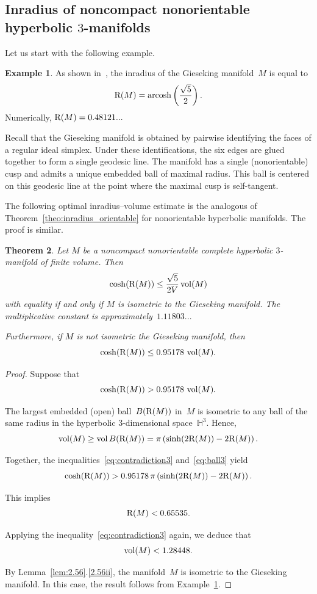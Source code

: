 \documentclass[11pt,reqno]{amsart}
\newtheorem{theorem}{Theorem}[section]
\theoremstyle{definition}
\newtheorem{example}[theorem]{Example}
\numberwithin{equation}{section}
\newcommand{\HH}{{\mathbb H}}
\newcommand\RR{{\rm R}}
\DeclareMathOperator{\vol}{{\rm vol}}
\DeclareMathOperator{\arcosh}{arcosh}
\numberwithin{equation}{section}
\begin{document}
\subsection{Inradius of noncompact nonorientable hyperbolic \texorpdfstring{$3$}{3}-manifolds}

Let us start with the following example.

\begin{example} \label{ex:gieseking}
As shown in~\cite[\S3.2]{gen}, the inradius of the Gieseking manifold~$M$ is equal to
\[
\RR(M) = \arcosh \left( \frac{\sqrt{5}}{2} \right).
\]
Numerically, $\RR(M) = 0.48121...$

Recall that the Gieseking manifold is obtained by pairwise identifying the faces of a regular ideal simplex.
Under these identifications, the six edges are glued together to form a single geodesic line.
The manifold has a single (nonorientable) cusp and admits a unique embedded ball of maximal radius.
This ball is centered on this geodesic line at the point where the maximal cusp is self-tangent.
\end{example}


The following optimal inradius--volume estimate is the analogous of Theorem~\ref{theo:inradius_orientable}  for nonorientable hyperbolic manifolds.
The proof is similar.


\begin{theorem} \label{theo:inradius_nonorientable}
Let $M$ be a noncompact nonorientable complete hyperbolic $3$-manifold of finite volume.
Then
\[
\cosh(\RR(M)) \leq \frac{\sqrt{5}}{2V} \vol(M)
\]
with equality if and only if $M$ is isometric to the Gieseking manifold.
The multiplicative constant is approximately~$1.11803...$

Furthermore, if $M$ is not isometric the Gieseking manifold, then 
\[
\cosh(\RR(M)) \leq 0.95178 \, \vol(M).
\]
\end{theorem}


\begin{proof}
Suppose that 
\begin{equation} \label{eq:contradiction3}
\cosh(\RR(M)) > 0.95178 \, \vol(M).
\end{equation}

The largest embedded (open) ball~$B(\RR(M))$ in~$M$ is isometric to any ball of the same radius in the hyperbolic $3$-dimensional space~$\HH^3$.
Hence,
\begin{equation} \label{eq:ball3}
\vol(M) \geq \vol B(\RR(M)) = \pi \left( \sinh(2 \RR(M)) - 2 \RR(M) \right).
\end{equation}

Together, the inequalities~\eqref{eq:contradiction3} and~\eqref{eq:ball3} yield
\[
\cosh(\RR(M)) > 0.95178 \, \pi \left( \sinh(2 \RR(M)) - 2 \RR(M) \right).
\]

This implies
\[
\RR(M) < 0.65535.
\]

Applying the inequality~\eqref{eq:contradiction3} again, we deduce that
\[
\vol(M) < 1.28448.
\]

By Lemma~\ref{lem:2.56}.\eqref{2.56ii}, the manifold~$M$ is isometric to the Gieseking manifold.
In this case, the result follows from Example~\ref{ex:gieseking}.
\end{proof}
\end{document}
